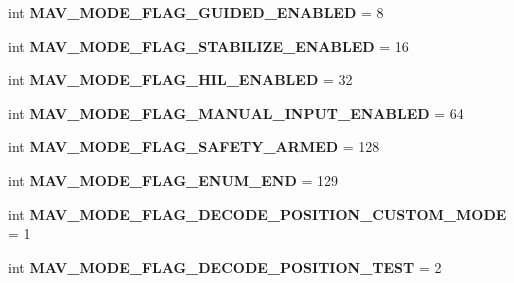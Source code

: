 \begin{DoxyCompactItemize}
int {\bfseries M\+A\+V\+\_\+\+M\+O\+D\+E\+\_\+\+F\+L\+A\+G\+\_\+\+G\+U\+I\+D\+E\+D\+\_\+\+E\+N\+A\+B\+L\+ED} = 8
\item 
\mbox{\label{namespacepymavlink_1_1dialects_1_1v10_a2e017518c909ede0779de0842f77fa05}} 
int {\bfseries M\+A\+V\+\_\+\+M\+O\+D\+E\+\_\+\+F\+L\+A\+G\+\_\+\+S\+T\+A\+B\+I\+L\+I\+Z\+E\+\_\+\+E\+N\+A\+B\+L\+ED} = 16
\item 
\mbox{\label{namespacepymavlink_1_1dialects_1_1v10_a5e790dda103ed657cb7ca839bcd0fa07}} 
int {\bfseries M\+A\+V\+\_\+\+M\+O\+D\+E\+\_\+\+F\+L\+A\+G\+\_\+\+H\+I\+L\+\_\+\+E\+N\+A\+B\+L\+ED} = 32
\item 
\mbox{\label{namespacepymavlink_1_1dialects_1_1v10_aa2f55c9882fa23da541964f83c5d4dc1}} 
int {\bfseries M\+A\+V\+\_\+\+M\+O\+D\+E\+\_\+\+F\+L\+A\+G\+\_\+\+M\+A\+N\+U\+A\+L\+\_\+\+I\+N\+P\+U\+T\+\_\+\+E\+N\+A\+B\+L\+ED} = 64
\item 
\mbox{\label{namespacepymavlink_1_1dialects_1_1v10_a5c4f16d64067af878ceaf72194345f89}} 
int {\bfseries M\+A\+V\+\_\+\+M\+O\+D\+E\+\_\+\+F\+L\+A\+G\+\_\+\+S\+A\+F\+E\+T\+Y\+\_\+\+A\+R\+M\+ED} = 128
\item 
\mbox{\label{namespacepymavlink_1_1dialects_1_1v10_a196df59846ca7715035ecdf5697ede88}} 
int {\bfseries M\+A\+V\+\_\+\+M\+O\+D\+E\+\_\+\+F\+L\+A\+G\+\_\+\+E\+N\+U\+M\+\_\+\+E\+ND} = 129
\item 
\mbox{\label{namespacepymavlink_1_1dialects_1_1v10_a107118f7e19ba26aa73b1454e804b481}} 
int {\bfseries M\+A\+V\+\_\+\+M\+O\+D\+E\+\_\+\+F\+L\+A\+G\+\_\+\+D\+E\+C\+O\+D\+E\+\_\+\+P\+O\+S\+I\+T\+I\+O\+N\+\_\+\+C\+U\+S\+T\+O\+M\+\_\+\+M\+O\+DE} = 1
\item 
\mbox{\label{namespacepymavlink_1_1dialects_1_1v10_a9c9a6e27730f2012f1d6f6ce72213ed3}} 
int {\bfseries M\+A\+V\+\_\+\+M\+O\+D\+E\+\_\+\+F\+L\+A\+G\+\_\+\+D\+E\+C\+O\+D\+E\+\_\+\+P\+O\+S\+I\+T\+I\+O\+N\+\_\+\+T\+E\+ST} = 2
\item 
\mbox{\label{namespacepymavlink_1_1dialects_1_1v10_a9524123e619e25e97da1fdc4ff397f16}} 

\end{DoxyCompactItemize}
